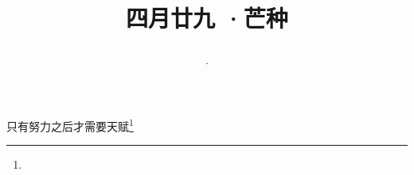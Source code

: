 \title{\date[d=5,m=6,y=2024][year:cn-y,年,month:cn,day:cn,日,·,weekday]·四月廿九 ·芒种}
只有努力之后才需要天赋\footnote{ }


